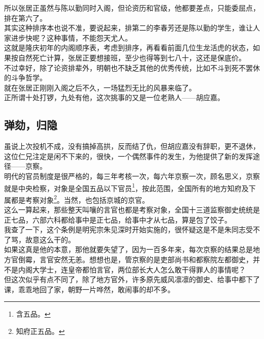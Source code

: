 \begin{multicols}{\theparacolNo}
所以张居正虽然与陈以勤同时入阁，但论资历和官级，他都要差点，只能委屈点，排在第六了。\\

其实这种排序本也说不准，要说起来，排第二的李春芳还是陈以勤的学生，谁让人家进步快呢？这种事情，不能怨天尤人。\\

这就是隆庆初年的内阁顺序表，考虑到排序，再看看前面几位生龙活虎的状态，如果按自然死亡计算，张居正要想接班，至少也得等到七八十，这还是保底价。\\

不过幸好，除了论资排辈外，明朝也不缺乏其他的优秀传统，比如不斗到死不罢休的斗争哲学。\\

就在张居正刚刚入阁之后不久，一场猛烈无比的风暴来临了。\\

正所谓十处打锣，九处有他，这次挑事的又是一位老熟人——胡应嘉。\\

\subsection{弹劾，归隐}
虽说上次投机不成，没有搞掉高拱，反而结了仇，但胡应嘉没有辞职，更不退休，这位仁兄注定是闲不下来的，很快，一个偶然事件的发生，为他提供了新的发挥途径——京察。\\

明代的官员制度是很严格的，每三年考核一次，每六年京察一次，顾名思义，京察就是中央检察，对象是全国五品以下官员\footnote{含五品。}，按此范围，全国所有的地方知府及下属都是考察对象\footnote{知府正五品。}。当然，也包括京城的京官。\\

这么一算起来，那些整天叫嚷的言官也都是考察对象，全国十三道监察御史统统是正七品，六部六科都给事中是正七品，给事中才从七品，算是包了饺子。\\

我查了一下，这个条例是明宪宗朱见深时开始实施的，很怀疑这是不是朱同志受不了骂，故意这么干的。\\

如果这真是他的本意，那他就要失望了，因为一百多年来，每次京察的结果总是地方官倒霉，言官安然无恙。想想也是，管京察的是吏部尚书和都察院左都御史，并不是内阁大学士，连皇帝都怕言官，两位部长大人怎么敢干得罪人的事情呢？\\

但这次似乎有点不同了，除了地方官外，许多原先威风凛凛的御史、给事中都下了课，乖乖地回了家，朝野一片哗然，敢闹事的却不多。\\


\end{multicols}
